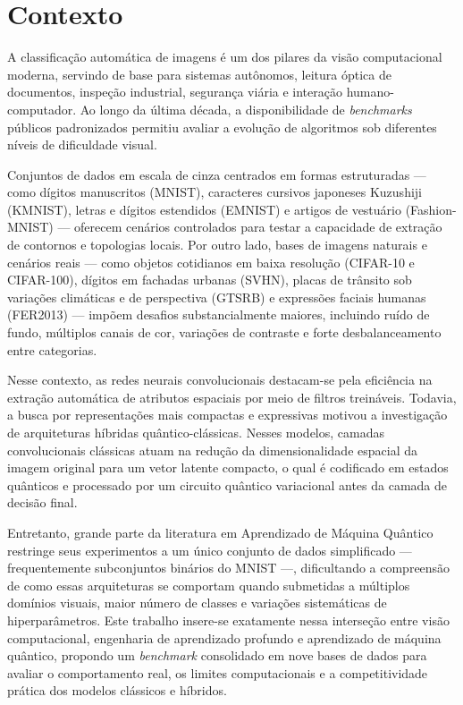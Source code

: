 \documentclass[
    12pt,
    openright,
    oneside,
    a4paper,
    english,
    brazil
]{abntex2}
\begin{document}
\section{Contexto}

A classificação automática de imagens é um dos pilares da visão computacional moderna, servindo de base para sistemas autônomos, leitura óptica de documentos, inspeção industrial, segurança viária e interação humano-computador. Ao longo da última década, a disponibilidade de \textit{benchmarks} públicos padronizados permitiu avaliar a evolução de algoritmos sob diferentes níveis de dificuldade visual.

Conjuntos de dados em escala de cinza centrados em formas estruturadas --- como dígitos manuscritos (MNIST), caracteres cursivos japoneses Kuzushiji (KMNIST), letras e dígitos estendidos (EMNIST) e artigos de vestuário (Fashion-MNIST) --- oferecem cenários controlados para testar a capacidade de extração de contornos e topologias locais. Por outro lado, bases de imagens naturais e cenários reais --- como objetos cotidianos em baixa resolução (CIFAR-10 e CIFAR-100), dígitos em fachadas urbanas (SVHN), placas de trânsito sob variações climáticas e de perspectiva (GTSRB) e expressões faciais humanas (FER2013) --- impõem desafios substancialmente maiores, incluindo ruído de fundo, múltiplos canais de cor, variações de contraste e forte desbalanceamento entre categorias.

Nesse contexto, as redes neurais convolucionais destacam-se pela eficiência na extração automática de atributos espaciais por meio de filtros treináveis. Todavia, a busca por representações mais compactas e expressivas motivou a investigação de arquiteturas híbridas quântico-clássicas. Nesses modelos, camadas convolucionais clássicas atuam na redução da dimensionalidade espacial da imagem original para um vetor latente compacto, o qual é codificado em estados quânticos e processado por um circuito quântico variacional antes da camada de decisão final.

Entretanto, grande parte da literatura em Aprendizado de Máquina Quântico restringe seus experimentos a um único conjunto de dados simplificado --- frequentemente subconjuntos binários do MNIST ---, dificultando a compreensão de como essas arquiteturas se comportam quando submetidas a múltiplos domínios visuais, maior número de classes e variações sistemáticas de hiperparâmetros. Este trabalho insere-se exatamente nessa interseção entre visão computacional, engenharia de aprendizado profundo e aprendizado de máquina quântico, propondo um \textit{benchmark} consolidado em nove bases de dados para avaliar o comportamento real, os limites computacionais e a competitividade prática dos modelos clássicos e híbridos.
\end{document}
